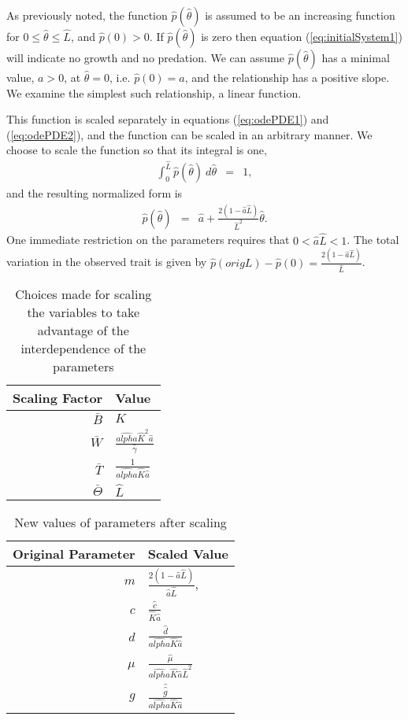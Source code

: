 \documentclass[review]{elsarticle}
\def\alpha{alpha}%
\newcommand{\origAlpha}{\hat{\alpha}}
\newcommand{\origK}{\hat{K}}
\newcommand{\origGamma}{\hat{\gamma}}
\newcommand{\origA}{\hat{a}}
\newcommand{\origC}{\hat{c}}
\newcommand{\origD}{\hat{d}}
\newcommand{\origG}{\hat{g}}
\newcommand{\origL}{\hat{L}}
\newcommand{\origP}[1]{\hat{p}(#1)}
\newcommand{\origTheta}{\hat{\theta}}
\newcommand{\origMu}{\hat{\mu}}
\begin{document}
As previously noted, the function $\origP{\origTheta}$ is assumed to be an
increasing function for $0\leq\origTheta\leq \origL$, and $\origP{0}>0$. If
$\origP{\origTheta}$ is zero then equation (\ref{eq:initialSystem1}) will
indicate no growth and no predation. We can assume $\origP{\origTheta}$ has a
minimal value, $a>0$,  at $\origTheta = 0$, i.e. $\origP{0}=a$, and the relationship has a positive slope. We
examine the simplest such relationship, a linear function.

This function is scaled separately in equations (\ref{eq:odePDE1}) and
(\ref{eq:odePDE2}), and the function can be scaled in an arbitrary
manner. We choose to scale the function so that its integral is one,
\begin{eqnarray*}
  \int^{\origL}_0 \origP{\origTheta} ~ d\origTheta & = & 1,
\end{eqnarray*}
and the resulting normalized form is
\begin{eqnarray}
  \label{eq:linearFormP}
  \origP{\origTheta} & = & \origA + \frac{2(1-\origA\origL)}{\origL^2} \origTheta.
\end{eqnarray}
One immediate restriction on the parameters requires that
$0<\origA\origL<1$. The total variation in the observed trait is given by 
$\origP{origL} - \origP{0} =\frac{2(1-\origA\origL)}{\origL}$.

\begin{table}[h]
  \centering
  \begin{tabular}{r|l}
    Scaling Factor & Value \\ \hline
    $\bar{B}$ & $K$ \\ [10pt]
    $\bar{W}$ & $\frac{\origAlpha \origK^2 \origA}{\origGamma}$ \\  [10pt]
    $\bar{T}$ & $\frac{1}{\origAlpha \origK \origA}$ \\  [10pt]
    $\bar{\Theta}$ & $\origL$
  \end{tabular}
  \caption{Choices made for scaling the variables to take advantage of the interdependence of the parameters}
  \label{tab:scalingChoices}
\end{table}

\begin{table}[h]
  \centering
  \begin{tabular}{r|l}
  Original Parameter & Scaled Value \\ \hline
    $m$   & $\frac{2(1-\origA\origL)}{\origA\origL}$, \\  [10pt]
    $c$   & $\frac{\origC}{\origK\origA}$ \\  [10pt]
    $d$   & $\frac{\origD}{\origAlpha\origK\origA}$ \\  [10pt]
    $\mu$ & $\frac{\origMu}{\origAlpha\origK\origA\origL^2}$  \\  [10pt]
    $g$   & $\frac{\hat{\origG}}{\origAlpha\origK\origA}$
  \end{tabular}
  \caption{New values of parameters after scaling}
  \label{tab:newParameters}
\end{table}
\end{document}
